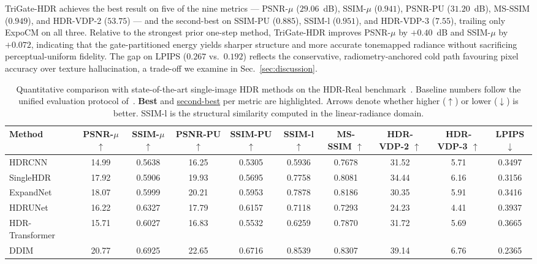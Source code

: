\documentclass[10pt,twocolumn,letterpaper]{article}
\begin{document}
TriGate-HDR achieves the best result on five of the nine metrics --- PSNR-$\mu$ ($29.06$~dB), SSIM-$\mu$ ($0.941$), PSNR-PU ($31.20$~dB), MS-SSIM ($0.949$), and HDR-VDP-2 ($53.75$) --- and the second-best on SSIM-PU ($0.885$), SSIM-l ($0.951$), and HDR-VDP-3 ($7.55$), trailing only ExpoCM on all three. Relative to the strongest prior one-step method, TriGate-HDR improves PSNR-$\mu$ by $+0.40$~dB and SSIM-$\mu$ by $+0.072$, indicating that the gate-partitioned energy yields sharper structure and more accurate tonemapped radiance without sacrificing perceptual-uniform fidelity. The gap on LPIPS ($0.267$ vs.\ $0.192$) reflects the conservative, radiometry-anchored cold path favouring pixel accuracy over texture hallucination, a trade-off we examine in Sec.~\ref{sec:discussion}.

\begin{table}[t]
\centering
\footnotesize
\setlength{\tabcolsep}{3.5pt}
\caption{Quantitative comparison with state-of-the-art single-image HDR methods on the HDR-Real benchmark~\cite{singlehdr}. Baseline numbers follow the unified evaluation protocol of~\cite{expocm}. \textbf{Best} and \underline{second-best} per metric are highlighted. Arrows denote whether higher ($\uparrow$) or lower ($\downarrow$) is better. SSIM-l is the structural similarity computed in the linear-radiance domain.}
\label{tab:main-results}
\begin{tabular}{lccccccccc}
\toprule
Method & PSNR-$\mu$ $\uparrow$ & SSIM-$\mu$ $\uparrow$ & PSNR-PU $\uparrow$ & SSIM-PU $\uparrow$ & SSIM-l $\uparrow$ & MS-SSIM $\uparrow$ & HDR-VDP-2 $\uparrow$ & HDR-VDP-3 $\uparrow$ & LPIPS $\downarrow$ \\
\midrule
HDRCNN~\cite{hdrcnn}          & 14.99 & 0.5638 & 16.25 & 0.5305 & 0.5936 & 0.7678 & 31.52 & 5.71 & 0.3497 \\
SingleHDR~\cite{singlehdr}    & 17.92 & 0.5906 & 19.93 & 0.5695 & 0.7758 & 0.8081 & 34.44 & 6.16 & 0.3156 \\
ExpandNet~\cite{expandnet}    & 18.07 & 0.5999 & 20.21 & 0.5953 & 0.7878 & 0.8186 & 30.35 & 5.91 & 0.3416 \\
HDRUNet~\cite{hdrunet}        & 16.22 & 0.6327 & 17.79 & 0.6157 & 0.7118 & 0.7293 & 24.23 & 4.41 & 0.3937 \\
HDR-Transformer~\cite{hdrtransformer} & 15.71 & 0.6027 & 16.83 & 0.5532 & 0.6259 & 0.7870 & 31.72 & 5.69 & 0.3665 \\
\midrule
DDIM~\cite{ddim}              & 20.77 & 0.6925 & 22.65 & 0.6716 & 0.8539 & 0.8307 & 39.14 & 6.76 & 0.2365 \\

\end{tabular}
\end{table}
\end{document}
